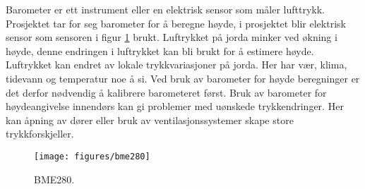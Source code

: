 Barometer er ett instrument eller en elektrisk sensor som måler lufttrykk. 
Prosjektet tar for seg barometer for å beregne høyde, i prosjektet blir 
elektrisk sensor som sensoren i figur \ref{fig:bme280} brukt. Luftrykket på 
jorda minker ved økning i høyde, denne endringen i luftrykket kan bli brukt for å estimere høyde. 
Luftrykket kan endret av lokale trykkvariasjoner på jorda. Her har vær, klima, 
tidevann og temperatur noe å si. Ved bruk av barometer for høyde 
beregninger er det derfor nødvendig å kalibrere barometeret først. Bruk av barometer for høydeangivelse 
innendørs kan gi problemer med uønskede trykkendringer. Her kan åpning av dører eller 
bruk av ventilasjonssystemer skape store trykkforskjeller.
\parencite{Gron2021piezo}

\begin{figure}[htp]
    \centering
    \texttt{[image: figures/bme280]}
    \caption{BME280. \parencite{Bosch}}
    \label{fig:bme280}
\end{figure}